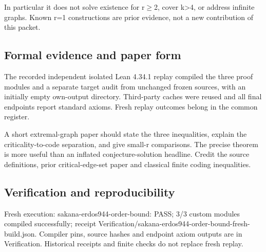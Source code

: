 \documentclass[11pt,a4paper]{article}
\begin{document}
In particular it does not solve existence for r\ensuremath{\geq}2, cover k>4, or address infinite graphs. Known r=1 constructions are prior evidence, not a new contribution of this packet.

\subsection{Formal evidence and paper form}
The recorded independent isolated Lean 4.34.1 replay compiled the three proof modules and a separate target audit from unchanged frozen sources, with an initially empty own-output directory. Third-party caches were reused and all final endpoints report standard axioms. Fresh replay outcomes belong in the common register.

A short extremal-graph paper should state the three inequalities, explain the criticality-to-code separation, and give small-r comparisons. The precise theorem is more useful than an inflated conjecture-solution headline. Credit the source definitions, prior critical-edge-set paper and classical finite coding inequalities.

\subsection{Verification and reproducibility}
Fresh execution: sakana-erdos944-order-bound: PASS; 3/3 custom modules compiled successfully; receipt Verification/sakana-erdos944-order-bound-fresh-build.json. Compiler pins, source hashes and endpoint axiom outputs are in Verification. Historical receipts and finite checks do not replace fresh replay.
\end{document}
